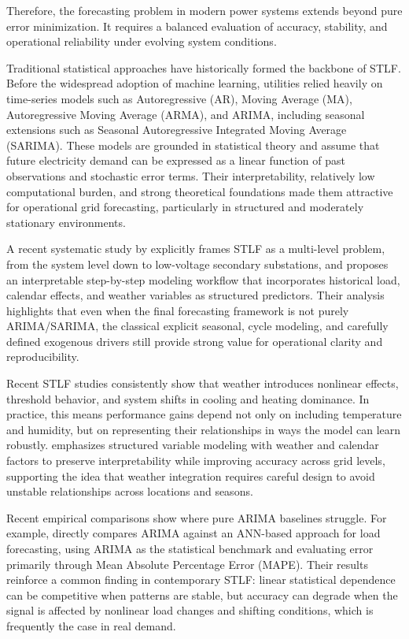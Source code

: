 \documentclass[conference]{IEEEtran}
\begin{document}
Therefore, the forecasting problem in modern power systems extends beyond pure error minimization. It requires a balanced evaluation of accuracy, stability, and operational reliability under evolving system conditions.

Traditional statistical approaches have historically formed the backbone of STLF. Before the widespread adoption of machine learning, utilities relied heavily on time-series models such as Autoregressive (AR), Moving Average (MA), Autoregressive Moving Average (ARMA), and ARIMA, including seasonal extensions such as Seasonal Autoregressive Integrated Moving Average (SARIMA). These models are grounded in statistical theory and assume that future electricity demand can be expressed as a linear function of past observations and stochastic error terms. Their interpretability, relatively low computational burden, and strong theoretical foundations made them attractive for operational grid forecasting, particularly in structured and moderately stationary environments.

A recent systematic study by \cite{Pinheiro} explicitly frames STLF as a multi-level problem, from the system level down to low-voltage secondary substations, and proposes an interpretable step-by-step modeling workflow that incorporates historical load, calendar effects, and weather variables as structured predictors. Their analysis highlights that even when the final forecasting framework is not purely ARIMA/SARIMA, the classical explicit seasonal, cycle modeling, and carefully defined exogenous drivers still provide strong value for operational clarity and reproducibility.

Recent STLF studies consistently show that weather introduces nonlinear effects, threshold behavior, and system shifts in cooling and heating dominance. In practice, this means performance gains depend not only on including temperature and humidity, but on representing their relationships in ways the model can learn robustly. \cite{Pinheiro} emphasizes structured variable modeling with weather and calendar factors to preserve interpretability while improving accuracy across grid levels, supporting the idea that weather integration requires careful design to avoid unstable relationships across locations and seasons.

Recent empirical comparisons show where pure ARIMA baselines struggle. For example, \cite{Tarmanini} directly compares ARIMA against an ANN-based approach for load forecasting, using ARIMA as the statistical benchmark and evaluating error primarily through Mean Absolute Percentage Error (MAPE). Their results reinforce a common finding in contemporary STLF: linear statistical dependence can be competitive when patterns are stable, but accuracy can degrade when the signal is affected by nonlinear load changes and shifting conditions, which is frequently the case in real demand. 
\end{document}
